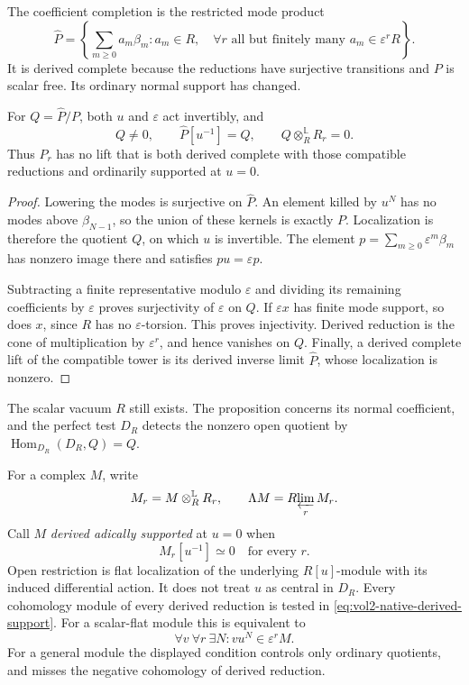 The coefficient completion is the restricted mode product
\begin{equation}\label{eq:vol2-native-normal-completion}
 \widehat P=
 \left\{\sum_{m\geq0}a_m\beta_m:
    a_m\in R,\quad
    \forall r\text{ all but finitely many }a_m\in\varepsilon^rR\right\}.
\end{equation}
It is derived complete because the reductions have surjective transitions
and \(P\) is scalar free. Its ordinary normal support has changed.

\begin{proposition}\label{prop:vol2-native-normal-open}
For \(Q=\widehat P/P\), both \(u\) and \(\varepsilon\) act invertibly,
and
\[
 Q\ne0,\qquad \widehat P[u^{-1}]=Q,
 \qquad Q\otimes_R^{\mathbb L}R_r=0.
\]
Thus \(P_r\) has no lift that is both derived complete with those
compatible reductions and ordinarily supported at \(u=0\).
\end{proposition}

\begin{proof}
Lowering the modes is surjective on \(\widehat P\). An element killed
by \(u^N\) has no modes above \(\beta_{N-1}\), so the union of these
kernels is exactly \(P\). Localization is therefore the quotient \(Q\),
on which \(u\) is invertible. The element
\(p=\sum_{m\geq0}\varepsilon^m\beta_m\) has nonzero image there and
satisfies \(pu=\varepsilon p\).

Subtracting a finite representative modulo \(\varepsilon\) and dividing
its remaining coefficients by \(\varepsilon\) proves surjectivity of
\(\varepsilon\) on \(Q\). If \(\varepsilon x\) has finite mode support,
so does \(x\), since \(R\) has no \(\varepsilon\)-torsion. This proves
injectivity. Derived reduction is the cone of multiplication by
\(\varepsilon^r\), and hence vanishes on \(Q\).
Finally, a derived complete lift of the compatible tower is its derived
inverse limit \(\widehat P\), whose localization is nonzero.
\end{proof}

The scalar vacuum \(R\) still exists. The proposition concerns its
normal coefficient, and the perfect test \(D_R\) detects the nonzero
open quotient by \(\operatorname{Hom}_{D_R}(D_R,Q)=Q\).

For a complex \(M\), write
\[
 M_r=M\otimes_R^{\mathbb L}R_r,
 \qquad \Lambda M=R\!\varprojlim_r M_r.
\]
Call \(M\) \emph{derived adically supported} at \(u=0\) when
\begin{equation}\label{eq:vol2-native-derived-support}
                         M_r[u^{-1}]\simeq0
                         \quad\text{for every }r.
\end{equation}
Open restriction is flat localization of the underlying
\(R[u]\)-module with its induced differential action. It does not treat
\(u\) as central in \(D_R\).
Every cohomology module of every derived reduction is tested in
\eqref{eq:vol2-native-derived-support}. For a scalar-flat module this is
equivalent to
\[
 \forall v\ \forall r\ \exists N:
                         vu^N\in\varepsilon^rM.
\]
For a general module the displayed condition controls only ordinary
quotients, and misses the negative cohomology of derived reduction.

